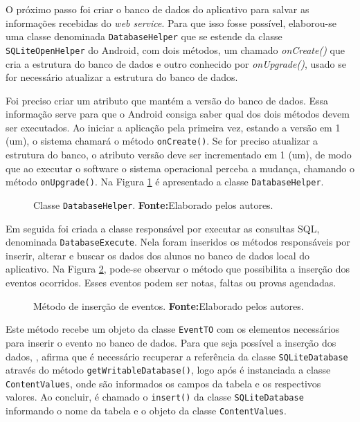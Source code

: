 	\par O próximo passo foi criar o banco de dados do aplicativo para salvar as
informações recebidas do \textit{web service}. Para que isso fosse possível,
elaborou-se uma classe denominada \texttt{DatabaseHelper} que se estende da
classe \texttt{SQLiteOpenHelper} do Android, com dois métodos, um chamado
\textit{onCreate()} que cria a estrutura do banco de dados e outro conhecido
por \textit{onUpgrade()}, usado se for necessário atualizar a estrutura do
banco de dados.

	\par Foi preciso criar um atributo que mantém a versão do banco de dados. Essa
informação serve para que o Android consiga saber qual dos dois métodos devem
ser executados. Ao iniciar a aplicação pela primeira vez, estando a versão em 1
(um), o sistema chamará o método \texttt{onCreate()}. Se for preciso atualizar
a estrutura do banco, o atributo versão deve ser incrementado em 1 (um), de
modo que ao executar o software o sistema operacional perceba a mudança,
chamando o método \texttt{onUpgrade()}. Na Figura \ref{fig:app5} é apresentado a
classe \texttt{DatabaseHelper}.

	\begin{figure}[h!] 
		
		\caption[Classe DatabaseHelper]{Classe \texttt{DatabaseHelper}.
		\textbf{Fonte:}Elaborado pelos autores.}
		\label{fig:app5}
	\end{figure}
	
	\par Em seguida foi criada a classe responsável por executar as consultas SQL,
denominada \texttt{DatabaseExecute}. Nela foram inseridos os métodos
responsáveis por inserir, alterar e buscar os dados dos alunos no banco de
dados local do aplicativo. Na Figura \ref{fig:app6}, pode-se observar o método
que possibilita a inserção dos eventos ocorridos. Esses eventos podem ser
notas, faltas ou provas agendadas.
	
	
	\begin{figure}[h!] 
		
		\caption[Método de inserção de eventos]{Método de inserção de eventos.
		\textbf{Fonte:}Elaborado pelos autores.}
		\label{fig:app6}
	\end{figure}
	
	\pagebreak
	
	\par Este método recebe um objeto da classe \texttt{EventTO} com os elementos
necessários para inserir o evento no banco de dados. Para que seja possível a
inserção dos dados, , afirma que é necessário
recuperar a referência da classe \texttt{SQLiteDatabase} através do método
\texttt{getWritableDatabase()}, logo após é instanciada a classe
\texttt{ContentValues}, onde são informados os campos da tabela e os
respectivos valores. Ao concluir, é chamado o \texttt{insert()} da classe
\texttt{SQLiteDatabase} informando o nome da tabela e o objeto da classe
\texttt{ContentValues}.

